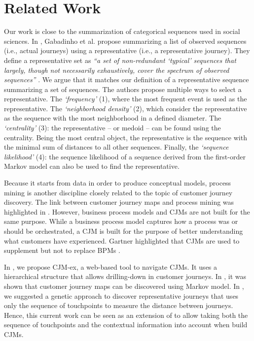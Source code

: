 \documentclass[runningheads]{llncs}
\begin{document}
{\section{Related Work}
Our work is close to the summarization of categorical sequences used in social sciences. In \cite{gabadinho2009summarizing,gabadinho2009extracting}, Gabadinho et al. propose summarizing a list of observed sequences (i.e., actual journeys) using a representative (i.e., a representative journey). They define a representative set as {\it``a set of non-redundant `typical' sequences that largely, though not necessarily exhaustively, cover the spectrum of observed sequences''} \cite{gabadinho2009summarizing}. We argue that it matches our definition of a representative sequence summarizing a set of sequences. The authors propose multiple ways to select a representative. The {\it `frequency'} (1), where the most frequent event is used as the representative. The {\it `neighborhood density'} (2), which consider the representative as the sequence with the most neighborhood in a defined diameter. The {\it `centrality'} (3): the representative {-- or medoid --} can be found using the centrality. {Being the most central object,} the representative is the sequence with the minimal sum of distances to all other sequences. Finally, the {\it `sequence likelihood'} (4): the sequence likelihood of a sequence derived from the first-order Markov model can also be used to find the representative. 

Because it starts from data in order to produce conceptual models, process mining is another discipline closely related to the topic of customer journey discovery. The link between customer journey maps and process mining was highlighted in \cite{bernard2017cjm}. However, business process models and CJMs are not built for the same purpose. While a business process model captures how a process was or should be orchestrated, a CJM is built for the purpose of better understanding what customers have experienced. Gartner highlighted that CJMs are used to supplement but not to replace BPMs \cite{Gartner2015}.

In \cite{bernard2017cjmEX}, we propose CJM-ex, a web-based tool to navigate CJMs. It uses a hierarchical structure that allows drilling-down in customer journeys. In \cite{bernard2017Markov}, it was shown that customer journey maps can be discovered using Markov model. In \cite{bernard2019genetic}, we suggested a genetic approach to discover representative journeys that uses only the sequence of touchpoints to measure the distance between journeys. Hence, this current work can be seen as an extension of \cite{bernard2019genetic} to allow taking both the sequence of touchpoints and the contextual information into account when build CJMs. 


}
\end{document}
